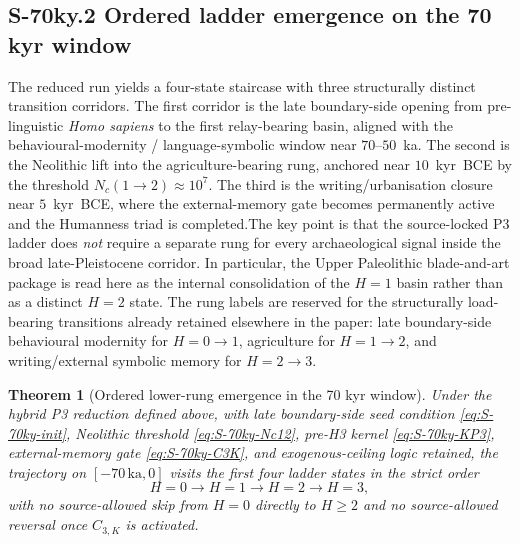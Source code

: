 \documentclass[11pt]{article}
\newtheorem{theorem}{Theorem}
\begin{document}
\subsection*{S-70ky.2 Ordered ladder emergence on the 70 kyr window}
\label{sec:S-70ky.2}The reduced run yields a four-state staircase with three structurally distinct transition corridors. The first corridor is the late boundary-side opening from pre-linguistic \textit{Homo sapiens} to the first relay-bearing basin, aligned with the behavioural-modernity / language-symbolic window near $70$--$50$~ka. The second is the Neolithic lift into the agriculture-bearing rung, anchored near $10$~kyr~BCE by the threshold $N_c(1\to 2)\approx 10^7$. The third is the writing/urbanisation closure near $5$~kyr~BCE, where the external-memory gate becomes permanently active and the Humanness triad is completed.The key point is that the source-locked P3 ladder does \emph{not} require a separate rung for every archaeological signal inside the broad late-Pleistocene corridor. In particular, the Upper Paleolithic blade-and-art package is read here as the internal consolidation of the $H{=}1$ basin rather than as a distinct $H{=}2$ state. The rung labels are reserved for the structurally load-bearing transitions already retained elsewhere in the paper: late boundary-side behavioural modernity for $H{=}0\to 1$, agriculture for $H{=}1\to 2$, and writing/external symbolic memory for $H{=}2\to 3$.
\begin{theorem}[Ordered lower-rung emergence in the 70 kyr window]
\label{thm:S-70ky-ladder-emergence}Under the hybrid P3 reduction defined above, with late boundary-side seed condition \eqref{eq:S-70ky-init}, Neolithic threshold \eqref{eq:S-70ky-Nc12}, pre-H3 kernel \eqref{eq:S-70ky-KP3}, external-memory gate \eqref{eq:S-70ky-C3K}, and exogenous-ceiling logic retained, the trajectory on $[-70\,\mathrm{ka},0]$ visits the first four ladder states in the strict order\[H=0 \longrightarrow H=1 \longrightarrow H=2 \longrightarrow H=3,\]with no source-allowed skip from $H{=}0$ directly to $H\ge 2$ and no source-allowed reversal once $C_{3,K}$ is activated.
\end{theorem}
\end{document}
